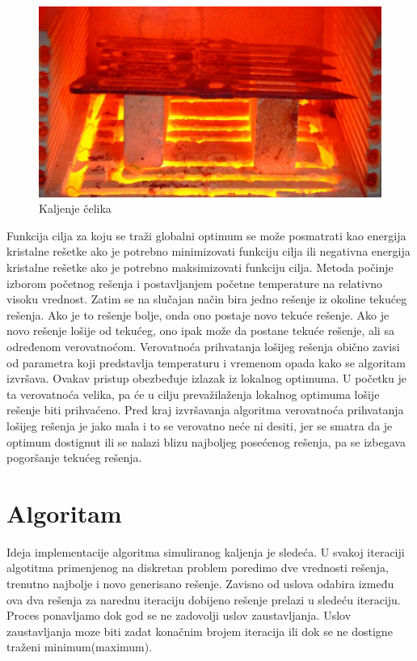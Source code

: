 \documentclass[a4paper]{article}
\begin{document}
\begin{figure}[h!]
\centering
\includegraphics[scale=0.3]{kal.jpg}
\caption{Kaljenje čelika}
\label{fig:universe}
\end{figure}

Funkcija cilja za koju se traži globalni optimum se može posmatrati kao energija kristalne rešetke ako je potrebno minimizovati funkciju cilja ili negativna energija kristalne rešetke ako
je potrebno maksimizovati funkciju cilja. Metoda počinje izborom početnog rešenja i postavljanjem početne temperature na relativno visoku vrednost. Zatim se na slučajan način bira
jedno rešenje iz okoline tekućeg rešenja. Ako je to rešenje bolje, onda ono postaje novo tekuće rešenje. Ako je novo rešenje lošije od tekućeg, ono ipak može da postane tekuće rešenje, ali
sa određenom verovatnoćom. Verovatnoća prihvatanja lošijeg rešenja obično zavisi od parametra koji predstavlja temperaturu i vremenom opada kako se algoritam izvršava. Ovakav pristup obezbeđuje izlazak iz lokalnog optimuma. U početku je ta verovatnoća velika, pa će
u cilju prevažilaženja lokalnog optimuma lošije rešenje biti prihvaćeno. Pred kraj izvršavanja
algoritma verovatnoća prihvatanja lošijeg rešenja je jako mala i to se verovatno neće ni desiti,
jer se smatra da je optimum dostignut ili se nalazi blizu najboljeg posećenog rešenja, pa se
izbegava pogoršanje tekućeg rešenja.


\section{Algoritam}
Ideja implementacije algoritma\cite{sannealingbook} simuliranog kaljenja je sledeća. U svakoj iteraciji algotitma primenjenog na diskretan problem poredimo dve vrednosti rešenja, trenutno najbolje i novo generisano rešenje. Zavisno od uslova odabira između ova dva rešenja za narednu iteraciju dobijeno rešenje prelazi u sledeću iteraciju. Proces ponavljamo  dok god se ne zadovolji uslov zaustavljanja. Uslov zaustavljanja moze biti zadat konačnim brojem iteracija ili dok se ne dostigne traženi minimum(maximum).
\end{document}
